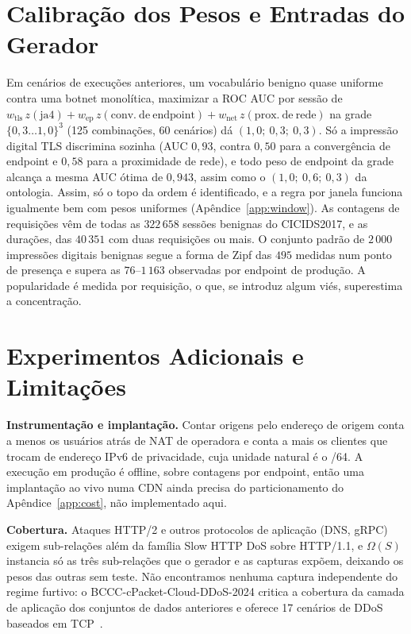 \documentclass[conference,letterpaper,10pt]{IEEEtran}
\newcommand\1{\textit{(i)}}
\newcommand\2{\textit{(ii)}}
\newcommand\3{\textit{(iii)}}
\begin{document}
\section{Calibração dos Pesos e Entradas do Gerador}
\label{app:calibration}

Em cenários de execuções anteriores, um vocabulário benigno quase uniforme contra uma botnet monolítica, maximizar a ROC AUC por sessão de $w_{\mathrm{tls}}\,z(\mathrm{ja4}) + w_{\mathrm{ep}}\,z(\mathrm{conv.\ de\ endpoint}) + w_{\mathrm{net}}\,z(\mathrm{prox.\ de\ rede})$ na grade $\{0{,}3\ldots1{,}0\}^3$ (125 combinações, 60 cenários) dá $(1{,}0;\ 0{,}3;\ 0{,}3)$. Só a impressão digital TLS discrimina sozinha (AUC $0{,}93$, contra $0{,}50$ para a convergência de endpoint e $0{,}58$ para a proximidade de rede), e todo peso de endpoint da grade alcança a mesma AUC ótima de $0{,}943$, assim como o $(1{,}0;\ 0{,}6;\ 0{,}3)$ da ontologia. Assim, só o topo da ordem é identificado, e a regra por janela funciona igualmente bem com pesos uniformes (Apêndice~\ref{app:window}). As contagens de requisições vêm de todas as $322\,658$ sessões benignas do CICIDS2017, e as durações, das $40\,351$ com duas requisições ou mais. O conjunto padrão de $2\,000$ impressões digitais benignas segue a forma de Zipf das $495$ medidas num ponto de presença e supera as $76$--$1\,163$ observadas por endpoint de produção. A popularidade é medida por requisição, o que, se introduz algum viés, superestima a concentração.

\section{Experimentos Adicionais e Limitações}
\label{app:limitations}

\textbf{Instrumentação e implantação.} Contar origens pelo endereço de origem conta a menos os usuários atrás de NAT de operadora e conta a mais os clientes que trocam de endereço IPv6 de privacidade, cuja unidade natural é o /64. A execução em produção é offline, sobre contagens por endpoint, então uma implantação ao vivo numa CDN ainda precisa do particionamento do Apêndice~\ref{app:cost}, não implementado aqui.

\textbf{Cobertura.} Ataques HTTP/2 e outros protocolos de aplicação (DNS, gRPC) exigem sub-relações além da família Slow HTTP DoS sobre HTTP/1.1, e $\Omega(S)$ instancia só as três sub-relações que o gerador e as capturas expõem, deixando os pesos das outras sem teste. Não encontramos nenhuma captura independente do regime furtivo: o BCCC-cPacket-Cloud-DDoS-2024 critica a cobertura da camada de aplicação dos conjuntos de dados anteriores e oferece 17 cenários de DDoS baseados em TCP~\cite{shafi2024bccc}.
\end{document}
